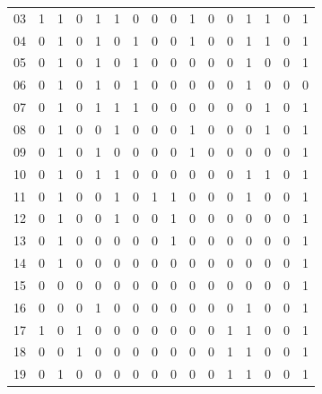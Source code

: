 \begin{esempio}
\begin{table}[H]
\begin{tabular}{c|ccccccccccccccc}
    03 & 1 & 1 & 0 & 1 & 1 & 0 & 0 & 0 & 1 & 0 & 0 & 1 & 1 & 0 & 1 \\
    04 & 0 & 1 & 0 & 1 & 0 & 1 & 0 & 0 & 1 & 0 & 0 & 1 & 1 & 0 & 1 \\
    05 & 0 & 1 & 0 & 1 & 0 & 1 & 0 & 0 & 0 & 0 & 0 & 1 & 0 & 0 & 1 \\
    06 & 0 & 1 & 0 & 1 & 0 & 1 & 0 & 0 & 0 & 0 & 0 & 1 & 0 & 0 & 0 \\
    07 & 0 & 1 & 0 & 1 & 1 & 1 & 0 & 0 & 0 & 0 & 0 & 0 & 1 & 0 & 1 \\
    08 & 0 & 1 & 0 & 0 & 1 & 0 & 0 & 0 & 1 & 0 & 0 & 0 & 1 & 0 & 1 \\
    09 & 0 & 1 & 0 & 1 & 0 & 0 & 0 & 0 & 1 & 0 & 0 & 0 & 0 & 0 & 1 \\
    10 & 0 & 1 & 0 & 1 & 1 & 0 & 0 & 0 & 0 & 0 & 0 & 1 & 1 & 0 & 1 \\
    11 & 0 & 1 & 0 & 0 & 1 & 0 & 1 & 1 & 0 & 0 & 0 & 1 & 0 & 0 & 1 \\
    12 & 0 & 1 & 0 & 0 & 1 & 0 & 0 & 1 & 0 & 0 & 0 & 0 & 0 & 0 & 1 \\
    13 & 0 & 1 & 0 & 0 & 0 & 0 & 0 & 1 & 0 & 0 & 0 & 0 & 0 & 0 & 1 \\
    14 & 0 & 1 & 0 & 0 & 0 & 0 & 0 & 0 & 0 & 0 & 0 & 0 & 0 & 0 & 1 \\
    15 & 0 & 0 & 0 & 0 & 0 & 0 & 0 & 0 & 0 & 0 & 0 & 0 & 0 & 0 & 1 \\
    16 & 0 & 0 & 0 & 1 & 0 & 0 & 0 & 0 & 0 & 0 & 0 & 1 & 0 & 0 & 1 \\
    17 & 1 & 0 & 1 & 0 & 0 & 0 & 0 & 0 & 0 & 0 & 1 & 1 & 0 & 0 & 1 \\
    18 & 0 & 0 & 1 & 0 & 0 & 0 & 0 & 0 & 0 & 0 & 1 & 1 & 0 & 0 & 1 \\ 
    19 & 0 & 1 & 0 & 0 & 0 & 0 & 0 & 0 & 0 & 0 & 1 & 1 & 0 & 0 & 1
  \end{tabular}
\end{table}
\end{esempio}

